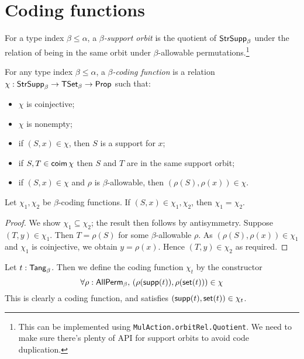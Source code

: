 \section{Coding functions}
\begin{definition}
  For a type index \( \beta \leq \alpha \), a \emph{\( \beta \)-support orbit} is the quotient of \( \mathsf{StrSupp}_\beta \) under the relation of being in the same orbit under \( \beta \)-allowable permutations.\footnote{This can be implemented using \texttt{MulAction.orbitRel.Quotient}. We need to make sure there's plenty of API for support orbits to avoid code duplication.}
\end{definition}
\begin{definition}
  For any type index \( \beta \leq \alpha \), a \emph{\( \beta \)-coding function} is a relation \( \chi : \mathsf{StrSupp}_\beta \to \mathsf{TSet}_\beta \to \mathsf{Prop} \) such that:
  \begin{itemize}
    \item \( \chi \) is coinjective;
    \item \( \chi \) is nonempty;
    \item if \( (S, x) \in \chi \), then \( S \) is a support for \( x \);
    \item if \( S, T \in \operatorname{\mathsf{coim}} \chi \) then \( S \) and \( T \) are in the same support orbit;
    \item if \( (S, x) \in \chi \) and \( \rho \) is \( \beta \)-allowable, then \( (\rho(S), \rho(x)) \in \chi \).
  \end{itemize}
\end{definition}
\begin{proposition}
  \label{prop:CodingFunction.ext}
  Let \( \chi_1, \chi_2 \) be \( \beta \)-coding functions.
  If \( (S, x) \in \chi_1, \chi_2 \), then \( \chi_1 = \chi_2 \).
\end{proposition}
\begin{proof}
  We show \( \chi_1 \subseteq \chi_2 \); the result then follows by antisymmetry.
  Suppose \( (T, y) \in \chi_1 \).
  Then \( T = \rho(S) \) for some \( \beta \)-allowable \( \rho \).
  As \( (\rho(S), \rho(x)) \in \chi_1 \) and \( \chi_1 \) is coinjective, we obtain \( y = \rho(x) \).
  Hence \( (T, y) \in \chi_2 \) as required.
\end{proof}
\begin{definition}
  Let \( t : \mathsf{Tang}_\beta \).
  Then we define the coding function \( \chi_t \) by the constructor
  \[ \forall \rho : \mathsf{AllPerm}_\beta,\, (\rho(\operatorname{\mathsf{supp}}(t)), \rho(\operatorname{\mathsf{set}}(t))) \in \chi \]
  This is clearly a coding function, and satisfies \( (\operatorname{\mathsf{supp}}(t), \operatorname{\mathsf{set}}(t)) \in \chi_t \).
\end{definition}

